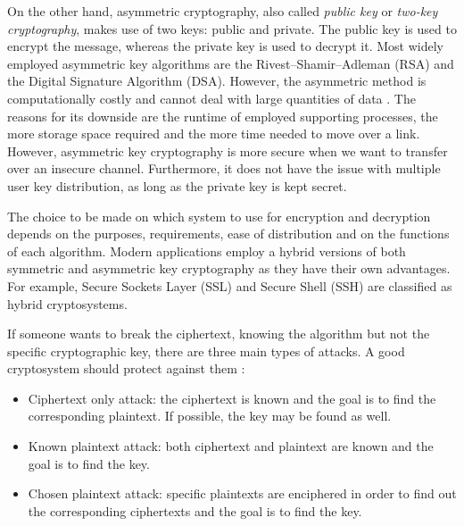 On the other hand, asymmetric cryptography, also called \emph{public key} or \emph{two-key cryptography}, makes use of two keys: public and private. The public key is used to encrypt the message, whereas the private key is used to decrypt it. Most widely employed asymmetric key algorithms are the Rivest–Shamir–Adleman (RSA) and the Digital Signature Algorithm (DSA). However, the asymmetric method is computationally costly and cannot deal with large quantities of data  \cite{wikikey}. The reasons for its downside are the runtime of employed supporting processes, the more storage space required and the more time needed to move over a link. However, asymmetric key cryptography is more secure when we want to transfer over an insecure channel. Furthermore, it does not have the issue with multiple user key distribution, as long as the private key is kept secret.

The choice to be made on which system to use for encryption and decryption depends on the purposes, requirements, ease of distribution and on the functions of each algorithm. Modern applications employ a hybrid versions of both symmetric and asymmetric key cryptography as they have their own advantages. For example, Secure Sockets Layer (SSL) and Secure Shell (SSH) are classified as hybrid cryptosystems. 

If someone wants to break the ciphertext, knowing the algorithm but not the specific cryptographic key, there are three main types of attacks. A good cryptosystem should protect against them \cite{stallings2017}:
\begin{itemize}
\item Ciphertext only attack: the ciphertext is known and the goal is to find the corresponding plaintext. If possible, the key may be found as well.
\end{itemize}
\begin{itemize}
\item Known plaintext attack: both ciphertext and plaintext are known and the goal is to find the key.
\end{itemize}
\begin{itemize}
\item Chosen plaintext attack: specific plaintexts are enciphered in order to find out the corresponding ciphertexts and the goal is to find the key.
\end{itemize}





